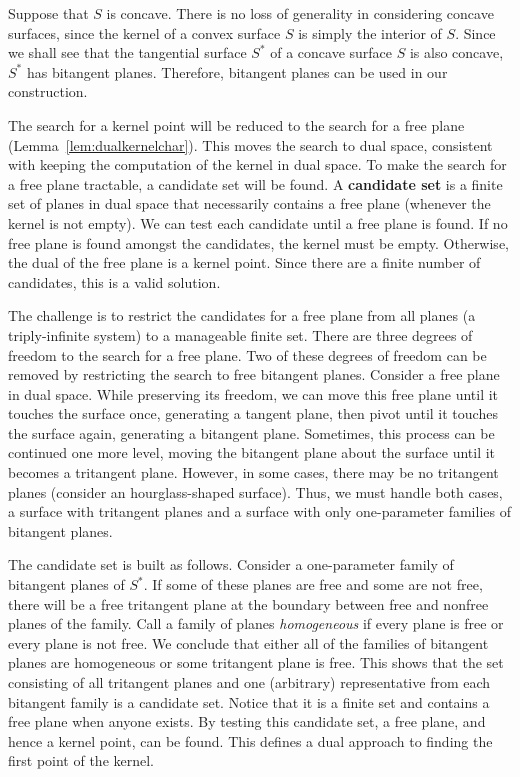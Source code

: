 \documentclass[doublespacing]{elsart}
\begin{document}
Suppose that $S$ is concave.
There is no loss of generality in considering concave surfaces,
since the kernel of a convex surface $S$ is simply the interior of $S$.
Since we shall see that the tangential surface $S^*$ of
a concave surface $S$ is also concave, $S^*$ has bitangent planes.
Therefore, bitangent planes can be used in our construction. %

The search for a kernel point will be reduced to the search for a free plane
(Lemma~\ref{lem:dualkernelchar}).
This moves the search to dual space, consistent with keeping the computation
of the kernel in dual space.
To make the search for a free plane tractable, a candidate set will be found.
A {\bf candidate set} is a finite set of planes in dual space
that necessarily contains a free plane (whenever the kernel is not empty).
We can test each candidate until a free plane is found.
If no free plane is found amongst the candidates,
the kernel must be empty.
Otherwise, the dual of the free plane is a kernel point.
Since there are a finite number of candidates, this is a valid solution.

The challenge is to restrict the candidates for a free plane from
all planes (a triply-infinite system) to a manageable finite set.
There are three degrees of freedom to the search for a free plane.
Two of these degrees of freedom can be removed by restricting the search
to free bitangent planes.
Consider a free plane in dual space.
While preserving its freedom, we can move this free plane
until it touches the surface once, generating a tangent plane,
then pivot until it touches the surface again, generating a bitangent plane.
Sometimes, this process can be continued one more level,
moving the bitangent plane about the surface until it becomes a
tritangent plane.
However, in some cases, there may be no tritangent planes
(consider an hourglass-shaped surface).
Thus, we must handle both cases, a surface with tritangent planes
and a surface with only one-parameter families of bitangent planes.

The candidate set is built as follows.
Consider a one-parameter family of bitangent planes of $S^*$.
If some of these planes are free and some are not free,
there will be a free tritangent plane at the boundary
between free and nonfree planes of the family.
Call a family of planes {\em homogeneous} if every plane is
free or every plane is not free.
We conclude that either all of the families of bitangent planes
are homogeneous or some tritangent plane is free.
This shows that the set consisting of all tritangent planes
and one (arbitrary) representative from each bitangent family
is a candidate set.
Notice that it is a finite set and contains a free plane when anyone exists.
By testing this candidate set, a free plane, and hence a kernel point, can be found.
This defines a dual approach to finding the first point of the kernel.
\end{document}

